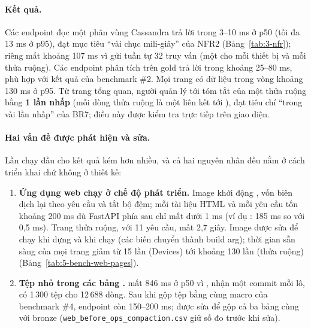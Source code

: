 \paragraph{Kết quả.} Các endpoint đọc một phân vùng Cassandra trả lời trong 3--10 ms ở p50 (tối đa 13 ms ở p95), đạt mục tiêu ``vài chục mili-giây'' của NFR2 (Bảng~\ref{tab:3-nfr}); riêng  mất khoảng 107 ms vì gửi tuần tự 32 truy vấn (một cho mỗi thiết bị và mỗi thửa ruộng). Các endpoint phân tích trên gold trả lời trong khoảng 25--80 ms, phù hợp với kết quả của benchmark \#2. Mọi trang có dữ liệu trong vòng khoảng 130 ms ở p95. Từ trang tổng quan, người quản lý tới tóm tắt của một thửa ruộng bằng \textbf{1 lần nhấp} (mỗi dòng thửa ruộng là một liên kết tới ), đạt tiêu chí ``trong vài lần nhấp'' của BR7; điều này được kiểm tra trực tiếp trên giao diện.

\paragraph{Hai vấn đề được phát hiện và sửa.} Lần chạy đầu cho kết quả kém hơn nhiều, và cả hai nguyên nhân đều nằm ở cách triển khai chứ không ở thiết kế:

\begin{enumerate}
  \item \textbf{Ứng dụng web chạy ở chế độ phát triển.} Image  khởi động , vốn biên dịch lại theo yêu cầu và tắt bộ đệm; mỗi tài liệu HTML và mỗi yêu cầu  tốn khoảng 200 ms dù FastAPI phía sau chỉ mất dưới 1 ms (ví dụ : 185 ms so với 0,5 ms). Trang thửa ruộng, với 11 yêu cầu, mất 2,7 giây. Image được sửa để chạy  khi dựng và  khi chạy (các biến  chuyển thành build arg); thời gian sẵn sàng của mọi trang giảm từ 15 lần (Devices) tới khoảng 130 lần (thửa ruộng) (Bảng~\ref{tab:5-bench-web-pages}).
  \item \textbf{Tệp nhỏ trong các bảng .}  mất 846 ms ở p50 vì , nhận một commit mỗi lô, có 1\,300 tệp cho 12\,688 dòng. Sau khi gộp tệp bằng cùng macro của benchmark \#4, endpoint còn 150--200 ms;  được sửa để gộp cả ba bảng  cùng với bronze (\texttt{web\_before\_ops\_compaction.csv} giữ số đo trước khi sửa).
\end{enumerate}

